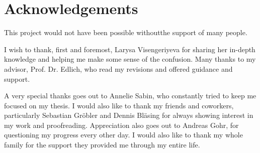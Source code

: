 \section*{Acknowledgements}
This project would not have been possible withoutthe support of many people.

I wish to thank, first and foremost, Larysa Visengeriyeva for sharing her in-depth knowledge and helping me make some sense of the confusion. Many thanks to my advisor, Prof. Dr. Edlich, who read my revisions and offered guidance and support.

A very special thanks goes out to Annelie Sabin, who constantly tried to keep me focused on my thesis. I would also like to thank my friends and coworkers, particularly Sebastian Gröbler and Dennis Bläsing for always showing interest in my work and proofreading. Appreciation also goes out to Andreas Gohr, for questioning my progress every other day. I would also like to thank my whole family for the support they provided me through my entire life.